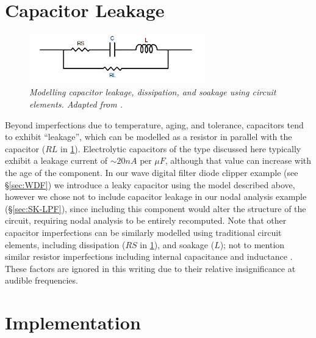 \documentclass[twoside,a4paper]{article}
\begin{document}
\section{Capacitor Leakage} \label{sec:capleak}
%
\begin{figure}[h]
    \center
    \includegraphics[width=3in]{Pics/capleak.png}
    \caption{\label{capleak}{\it Modelling capacitor leakage,
    dissipation, and soakage using circuit elements. Adapted from
    \cite{capleak}.}}
\end{figure}
%
Beyond imperfections due to temperature, aging, and tolerance,
capacitors tend to exhibit ``leakage'', which can be modelled
as a resistor in parallel with the capacitor ($RL$ in \cref{capleak}).
Electrolytic capacitors of the type discussed here typically exhibit
a leakage current of $\sim 20 nA \text{ per } \mu F$, although that
value can increase with the age of the component. In our wave digital
filter diode clipper example (see \S\ref{sec:WDF}) we introduce a leaky
capacitor using the model described above, however we chose not to include
capacitor leakage in our nodal analysis example (\S\ref{sec:SK-LPF}),
since including this component would alter the structure of the circuit,
requiring nodal analysis to be entirely recomputed.
\newline\newline
Note that other capacitor imperfections can be similarly modelled using
traditional circuit elements, including dissipation ($RS$ in
\cref{capleak}), and soakage ($L$); not to mention similar resistor
imperfections including internal capacitance and inductance \cite{capleak}.
These factors are ignored in this writing due to their relative
insignificance at audible frequencies.

\section{Implementation} \label{sec:impl}
%
\end{document}

